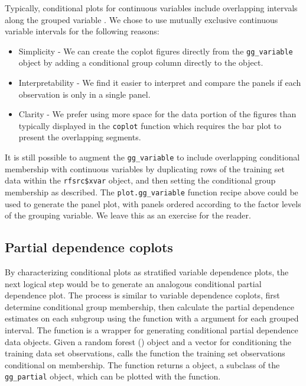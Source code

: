 \documentclass[article, nojss]{jss}
\begin{document}
Typically, conditional plots for continuous variables include
overlapping intervals along the grouped variable \citep{cleveland:1993}.
We chose to use mutually exclusive continuous variable intervals for the
following reasons:

\begin{itemize}
\item
  Simplicity - We can create the coplot figures directly from the
  \texttt{gg\_variable} object by adding a conditional group column
  directly to the object.
\item
  Interpretability - We find it easier to interpret and compare the
  panels if each observation is only in a single panel.
\item
  Clarity - We prefer using more space for the data portion of the
  figures than typically displayed in the \texttt{coplot} function which
  requires the bar plot to present the overlapping segments.
\end{itemize}

It is still possible to augment the \texttt{gg\_variable} to include
overlapping conditional membership with continuous variables by
duplicating rows of the training set data within the
\texttt{rfsrc\$xvar} object, and then setting the conditional group
membership as described. The \texttt{plot.gg\_variable} function recipe
above could be used to generate the panel plot, with panels ordered
according to the factor levels of the grouping variable. We leave this
as an exercise for the reader.

\subsection{Partial dependence
coplots}\label{partial-dependence-coplots}

By characterizing conditional plots as stratified variable dependence
plots, the next logical step would be to generate an analogous
conditional partial dependence plot. The process is similar to variable
dependence coplots, first determine conditional group membership, then
calculate the partial dependence estimates on each subgroup using the
 function with a  argument for each
grouped interval. The  
function is a wrapper for generating conditional partial dependence data
objects. Given a random forest () object and a 
vector for conditioning the training data set observations,
 calls the  function the
training set observations conditional on  membership. The
function returns a  object, a subclass of the
\texttt{gg\_partial} object, which can be plotted with the
 function.
\end{document}
